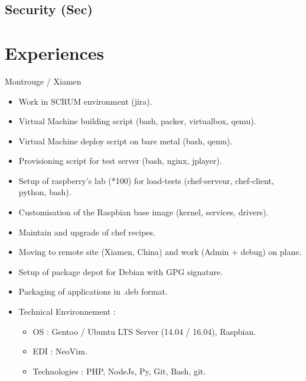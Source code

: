 \documentclass[10pt,a4paper,sans]{moderncv}
\begin{document}
\subsection{Security (Sec)}

\section{Experiences}

{Montrouge / Xiamen}{
  \begin{itemize}%
    \item Work in SCRUM environment (jira).
    \item Virtual Machine building script (bash, packer, virtualbox, qemu).
    \item Virtual Machine deploy script on bare metal (bash, qemu).
    \item Provisioning script for test server (bash, nginx, jplayer).
    \item Setup of raspberry's lab (*100) for load-tests (chef-serveur, chef-client, python, bash).
    \item Customisation of the Raspbian base image (kernel, services, drivers).
    \item Maintain and upgrade of chef recipes.
    \item Moving to remote site (Xiamen, China) and work (Admin + debug) on plane.
    \item Setup of package depot for Debian with GPG signature.
    \item Packaging of applications in .deb format.
    \item Technical Environnement :
      \begin{itemize}%
        \item OS : Gentoo / Ubuntu LTS Server (14.04 / 16.04), Raspbian.
        \item EDI : NeoVim.
        \item Technologies : PHP, NodeJs, Py, Git, Bash, git.
      \end{itemize}
  \end{itemize}}
\end{document}
